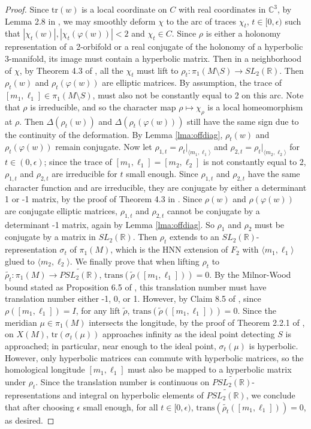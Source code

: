 \documentclass{article}
\theoremstyle{plain}
\theoremstyle{definition}
\theoremstyle{plain}
\theoremstyle{plain}
\theoremstyle{plain}
\theoremstyle{remark}
\theoremstyle{remark}
\theoremstyle{plain}
\theoremstyle{plain}
\begin{document}
\begin{proof}
Since $\text{tr}(w)$ is a local coordinate on $C$ with real coordinates in $\mathbb{C}^3$, by Lemma 2.8 in \cite{cullerdunfield}, we may smoothly deform $\chi$ to the arc of traces $\chi_t$, $t \in [0, \epsilon)$ such that $|\chi_t(w)|, |\chi_t(\varphi(w))| < 2$ and $\chi_t \in C$. Since $\rho$ is either a holonomy representation of a 2-orbifold or a real conjugate of the holonomy of a hyperbolic 3-manifold, its image must contain a hyperbolic matrix. Then in a neighborhood of $\chi$, by Theorem 4.3 of \cite{goldman}, all the $\chi_t$ must lift to $\rho_t: \pi_1(M \setminus S) \to SL_2(\mathbb{R})$. Then $\rho_t(w)$ and $\rho_t(\varphi(w))$ are elliptic matrices. By assumption, the trace of $[m_1, \ell_1] \in \pi_1(M \setminus S)$, must also not be constantly equal to 2 on this arc. Note that $\rho$ is irreducible, and so the character map $\rho \mapsto \chi_\rho$ is a local homeomorphism at $\rho$. Then $\Delta(\rho_t(w))$ and $\Delta(\rho_t(\varphi(w)))$ still have the same sign due to the continuity of the deformation. By Lemma \ref{lma:offdiag}, $\rho_t(w)$ and $\rho_t(\varphi(w))$ remain conjugate. Now let $\rho_{1, t} = \rho_t|_{\langle m_1, \ell_1 \rangle}$ and $\rho_{2, t} = \rho_t|_{\langle m_2, \ell_2 \rangle}$ for $t \in (0, \epsilon)$; since the trace of $[m_1, \ell_1] = [m_2, \ell_2]$ is not constantly equal to 2, $\rho_{1, t}$ and $\rho_{2, t}$ are irreducible for $t$ small enough. Since $\rho_{1, t}$ and $\rho_{2, t}$ have the same character function and are irreducible, they are conjugate by either a determinant 1 or -1 matrix, by the proof of Theorem 4.3 in \cite{goldman}. Since $\rho(w)$ and $\rho(\varphi(w))$ are conjugate elliptic matrices, $\rho_{1, t}$ and $\rho_{2, t}$ cannot be conjugate by a determinant -1 matrix, again by Lemma \ref{lma:offdiag}. So $\rho_1$ and $\rho_2$ must be conjugate by a matrix in $SL_2(\mathbb{R})$. Then $\rho_t$ extends to an $SL_2(\mathbb{R})$-representation $\sigma_t$ of $\pi_1(M)$, which is the HNN extension of $F_2$ with $\langle m_1, \ell_1 \rangle$ glued to $\langle m_2, \ell_2 \rangle$. We finally prove that when lifting $\rho_t$ to $\widetilde{\rho_t}: \pi_1(M) \to \widetilde{PSL_2(\mathbb{R})}$, $\text{trans}(\widetilde{\rho}([m_1, \ell_1])) = 0$. By the Milnor-Wood bound stated as Proposition 6.5 of \cite{cullerdunfield}, this translation number must have translation number either -1, 0, or 1. However, by Claim 8.5 of \cite{cullerdunfield}, since $\rho([m_1, \ell_1]) = I$, for any lift $\widetilde{\rho}$, $\text{trans}(\widetilde{\rho}([m_1, \ell_1])) = 0$. Since the meridian $\mu \in \pi_1(M)$ intersects the longitude, by the proof of Theorem 2.2.1 of \cite{cullershalen}, on $X(M)$, $\text{tr}(\sigma_t(\mu))$ approaches infinity as the ideal point detecting $S$ is approached; in particular, near enough to the ideal point, $\sigma_t(\mu)$ is hyperbolic. However, only hyperbolic matrices can commute with hyperbolic matrices, so the homological longitude $[m_1, \ell_1]$ must also be mapped to a hyperbolic matrix under $\rho_t$. Since the translation number is continuous on $\widetilde{PSL_2(\mathbb{R})}$-representations and integral on hyperbolic elements of $\widetilde{PSL_2(\mathbb{R})}$, we conclude that after choosing $\epsilon$ small enough, for all $t \in [0, \epsilon)$, $\text{trans}(\widetilde{\rho_t}([m_1, \ell_1])) = 0$, as desired. 

\end{proof}
\end{document}
